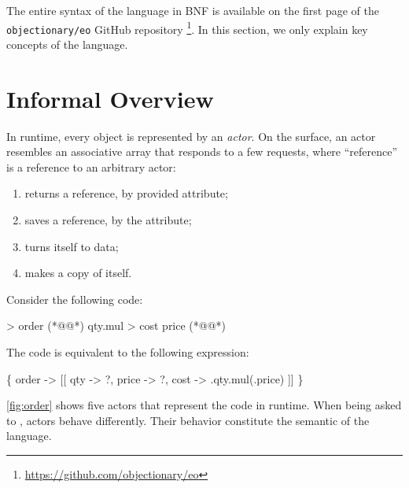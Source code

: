 


The entire syntax of the \eolang{} language in BNF is available on the first page of the \texttt{objectionary/eo} GitHub repository%
  \footnote{\url{https://github.com/objectionary/eo}}.
In this section, we only explain key concepts of the language.

\section{Informal Overview}

In runtime, every \eolang{} object is represented by an \emph{actor}.
On the surface, an actor resembles an associative array that responds to a few requests, where ``reference'' is a reference to an arbitrary actor:
\begin{enumerate}
  \item {} returns a reference, by provided attribute;
  \item {} saves a reference, by the attribute;
  \item {} turns itself to data;
  \item {} makes a copy of itself.
\end{enumerate}

Consider the following code:

\begin{ffcode}
 > order (*@\label{ln:order-start}@*)
  qty.mul > cost
    price (*@\label{ln:order-stop}@*)
\end{ffcode}

The code is equivalent to the following \phic{} expression:
\begin{phiquation*}
\Big\{ order -> [[ qty -> ?, price -> ?, cost -> \xi.qty.mul(\xi.price) ]] \Big\}
\end{phiquation*}

\cref{fig:order} shows five actors that represent the code in runtime.
When being asked to , actors behave differently.
Their behavior constitute the semantic of the language.

